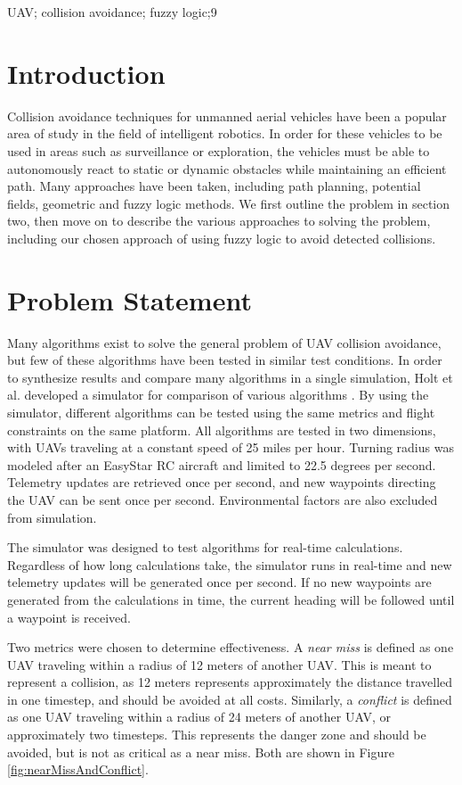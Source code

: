 \documentclass[10pt, conference, compsocconf]{IEEEtran}
\begin{document}
\begin{IEEEkeywords}
UAV; collision avoidance; fuzzy logic;9

\end{IEEEkeywords}





\section{Introduction}
Collision avoidance techniques for unmanned aerial vehicles have been a popular area of study in the field of intelligent robotics. In order for these vehicles to be used in areas such as surveillance or exploration, the vehicles must be able to autonomously react to static or dynamic obstacles while maintaining an efficient path.  Many approaches have been taken, including path planning, potential fields,  geometric and fuzzy logic methods. We first outline the problem in section two, then move on to describe the various approaches to solving the problem, including our chosen approach of using fuzzy logic to avoid detected collisions.
\section{Problem Statement}
Many algorithms exist to solve the general problem of UAV collision avoidance, but few of these algorithms have been tested in similar test conditions. In order to synthesize results and compare many algorithms in a single simulation, Holt et al. developed a simulator for comparison of various algorithms \cite{holtthesis}.  By using the simulator, different algorithms can be tested using the same metrics and flight constraints on the same platform. All algorithms are tested in two dimensions, with UAVs traveling at a constant speed of 25 miles per hour. Turning radius was modeled after an EasyStar RC aircraft and limited to 22.5 degrees per second. Telemetry updates are retrieved once per second, and new waypoints directing the UAV can be sent once per second. Environmental factors are also excluded from simulation.

The simulator was designed to test algorithms for real-time calculations. Regardless of how long calculations take, the simulator runs in real-time and new telemetry updates will be generated once per second. If no new waypoints are generated from the calculations in time, the current heading will be followed until a waypoint is received.

Two metrics were chosen to determine effectiveness.  A {\it near miss} is defined as one UAV traveling within a radius of 12 meters of another UAV. This is meant to represent a collision, as 12 meters represents approximately the distance travelled in one timestep, and should be avoided at all costs. Similarly, a {\it conflict} is defined as one UAV traveling within a radius of 24 meters of another UAV, or approximately two timesteps. This represents the danger zone and should be avoided, but is not as critical as a near miss. Both are shown in Figure \ref{fig:nearMissAndConflict}.
\end{document}

